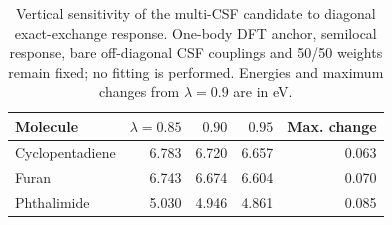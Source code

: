 \begin{table}[!htbp]
\centering\small
\caption{Vertical sensitivity of the multi-CSF candidate to diagonal exact-exchange response. One-body DFT anchor, semilocal response, bare off-diagonal CSF couplings and 50/50 weights remain fixed; no fitting is performed. Energies and maximum changes from $\lambda=0.9$ are in eV.}\label{tab:multicsfsens}
\begin{tabular}{lrrrr}
\toprule
Molecule & $\lambda=0.85$ & $0.90$ & $0.95$ & Max. change \\
\midrule
Cyclopentadiene & 6.783 & 6.720 & 6.657 & 0.063 \\
Furan & 6.743 & 6.674 & 6.604 & 0.070 \\
Phthalimide & 5.030 & 4.946 & 4.861 & 0.085 \\
\bottomrule
\end{tabular}
\end{table}
